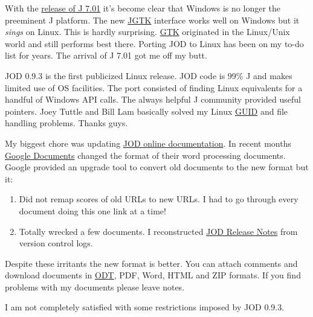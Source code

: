 With the
\href{http://bakerjd99.wordpress.com/2011/02/12/j-7-01-now-playing-in-your-browser/}{release
of J 7.01} it's become clear that Windows is no longer the preeminent J
platform. The new
\href{http://www.jsoftware.com/jwiki/System/Installation/J701/Gtk\#Install}{JGTK}
interface works well on Windows but it \emph{sings} on Linux. This is
hardly surprising. \href{http://www.gtk.org/}{GTK} originated in the
Linux/Unix world and still performs best there. Porting JOD to Linux has
been on my to-do list for years. The arrival of J 7.01 got me off my
butt.

JOD 0.9.3 is the first publicized Linux release. JOD code is 99\% J and
makes limited use of OS facilities. The port consisted of finding Linux
equivalents for a handful of Windows API calls. The always helpful J
community provided useful pointers. Joey Tuttle and Bill Lam basically
solved my Linux
\href{http://en.wikipedia.org/wiki/Globally\_unique\_identifier}{GUID}
and file handling problems. Thanks guys.

My biggest chore was updating
\href{https://docs.google.com/document/d/1pR1kc27OwTEGZ4BavhYT4RVvAtlEEUzueT9T-URY9t0/edit?hl=en\_US}{JOD
online documentation}. In recent months
\href{https://docs.google.com}{Google Documents} changed the format of
their word processing documents. Google provided an upgrade tool to
convert old documents to the new format but it:

\begin{enumerate}
\tightlist
\item
  Did not remap scores of old URLs to new URLs. I had to go through
  every document doing this one link at a time!
\item
  Totally wrecked a few documents. I reconstructed
  \href{https://docs.google.com/document/d/1aBdt8rwdOq\_CQ52qRQ-js1MwiaovC2pxlQq-Z9VosOg/edit?hl=en\_US}{JOD
  Release Notes} from version control logs.
\end{enumerate}
Despite these irritants the new format is better. You can attach
comments and download documents in
\href{http://www.coolutils.com/Formats/ODT}{ODT}, PDF, Word, HTML and
ZIP formats. If you find problems with my documents please leave notes.

I am not completely satisfied with some restrictions imposed by JOD
0.9.3.

